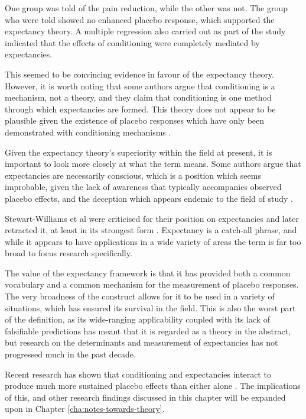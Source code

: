 One group was told of the pain reduction, while the other was not. The group who were told showed no enhanced placebo response, which supported the expectancy theory. A multiple regression also carried out as part of the study indicated that the effects of conditioning were completely mediated by expectancies. 

This seemed to be convincing evidence in favour of the expectancy theory. However, it is worth noting that some authors \cite{Stewart-Williams2004a}  argue that conditioning is a mechanism, not a theory, and they claim that conditioning is one method through which expectancies are formed. This theory does not appear to be plausible given the existence of placebo responses which have only been demonstrated with conditioning mechanisms \cite{Benedetti2003a}.   

Given the expectancy theory's superiority within the field at present, it is important to look more closely at what the term means. Some authors \cite{Stewart-Williams2004a}  argue that expectancies are necessarily conscious, which is a position which seems improbable, given the lack of awareness that typically accompanies observed placebo effects, and the deception which appears endemic to the field of study \cite{Miller2008a,Miller2008}.  

Stewart-Williams et al were criticised for their position on expectancies \cite{Kirsch2004}  and later retracted it, at least in its strongest form \cite{Stewart-Williams2004}. Expectancy is a catch-all phrase, and while it appears to have applications in a wide variety of areas \cite{Montgomery2007} the term is far too broad to focus research specifically. 

The value of the expectancy framework is that it has provided both a common vocabulary and a common mechanism for the measurement of placebo responses. The very broadness of the construct allows for it to be used in a variety of situations, which has ensured its survival in the field. This is also the worst part of the definition, as its wide-ranging applicability coupled with its lack of falsifiable predictions has meant that it is regarded as a theory in the abstract, but research on the determinants and measurement of expectancies has not progressed much in the past decade. 

Recent research has shown that conditioning and expectancies interact to produce much more sustained placebo effects than either alone . The implications of this, and other research findings discussed in this chapter will be expanded upon in Chapter \ref{cha:notes-towards-theory}. 

